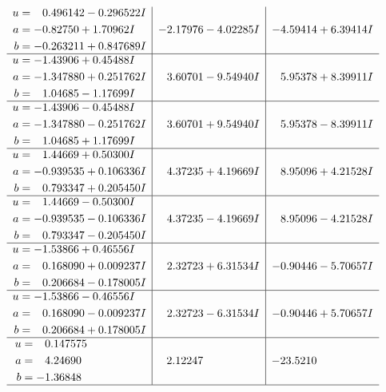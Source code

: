 \documentclass[1p]{elsarticle_modified}
\theoremstyle{definition}
\begin{document}
$$\begin{array}{c|c|c}
\begin{aligned}
u &= \phantom{-}0.496142 - 0.296522 I \\
a &= -0.82750 + 1.70962 I \\
b &= -0.263211 + 0.847689 I\end{aligned}
 & -2.17976 - 4.02285 I & -4.59414 + 6.39414 I \\ \hline\begin{aligned}
u &= -1.43906 + 0.45488 I \\
a &= -1.347880 + 0.251762 I \\
b &= \phantom{-}1.04685 - 1.17699 I\end{aligned}
 & \phantom{-}3.60701 - 9.54940 I & \phantom{-}5.95378 + 8.39911 I \\ \hline\begin{aligned}
u &= -1.43906 - 0.45488 I \\
a &= -1.347880 - 0.251762 I \\
b &= \phantom{-}1.04685 + 1.17699 I\end{aligned}
 & \phantom{-}3.60701 + 9.54940 I & \phantom{-}5.95378 - 8.39911 I \\ \hline\begin{aligned}
u &= \phantom{-}1.44669 + 0.50300 I \\
a &= -0.939535 + 0.106336 I \\
b &= \phantom{-}0.793347 + 0.205450 I\end{aligned}
 & \phantom{-}4.37235 + 4.19669 I & \phantom{-}8.95096 + 4.21528 I \\ \hline\begin{aligned}
u &= \phantom{-}1.44669 - 0.50300 I \\
a &= -0.939535 - 0.106336 I \\
b &= \phantom{-}0.793347 - 0.205450 I\end{aligned}
 & \phantom{-}4.37235 - 4.19669 I & \phantom{-}8.95096 - 4.21528 I \\ \hline\begin{aligned}
u &= -1.53866 + 0.46556 I \\
a &= \phantom{-}0.168090 + 0.009237 I \\
b &= \phantom{-}0.206684 - 0.178005 I\end{aligned}
 & \phantom{-}2.32723 + 6.31534 I & -0.90446 - 5.70657 I \\ \hline\begin{aligned}
u &= -1.53866 - 0.46556 I \\
a &= \phantom{-}0.168090 - 0.009237 I \\
b &= \phantom{-}0.206684 + 0.178005 I\end{aligned}
 & \phantom{-}2.32723 - 6.31534 I & -0.90446 + 5.70657 I \\ \hline\begin{aligned}
u &= \phantom{-}0.147575\phantom{ +0.000000I} \\
a &= \phantom{-}4.24690\phantom{ +0.000000I} \\
b &= -1.36848\phantom{ +0.000000I}\end{aligned}
 & \phantom{-}2.12247\phantom{ +0.000000I} & -23.5210\phantom{ +0.000000I}\\
 \hline 
 \end{array}$$\newpage
\end{document}
